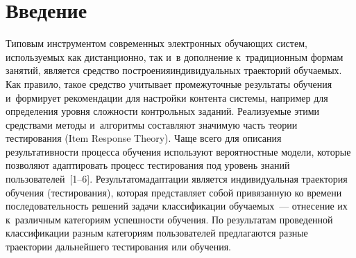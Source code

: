 
  



\thispagestyle{headings}

\begin{multicols}{2}

\label{st\stat}

\section{Введение}

     Типовым инструментом современных электронных обучающих систем, 
используемых как дистанционно, так и~в дополнение к~традиционным 
формам занятий, является средство построения\linebreak \mbox{индивидуальных} траекторий 
обучаемых. Как правило, такое средство учитывает промежуточные\linebreak 
результаты обучения и~формирует рекомендации для настройки контента 
системы, например для определения уровня сложности контрольных 
заданий. %
Реализуемые этими средствами методы и~алгоритмы составляют 
значимую часть тео\-рии тестирования (Item Response Theory). Чаще всего для 
описания результативности процесса обучения \mbox{используют} вероятностные 
модели, которые позволяют адаптировать процесс тестирования под уровень 
знаний пользователей~[1--6]. Результатом\linebreak адаптации является 
индивидуальная траектория обучения (тестирования), которая представляет 
собой привязанную ко времени последовательность решений задачи 
классификации обучаемых~--- отнесение их к~различным категориям 
успешности обучения. По результатам проведенной классификации разным 
категориям пользователей предлагаются разные траектории дальнейшего 
тестирования или обучения.
     

\end{multicols}
